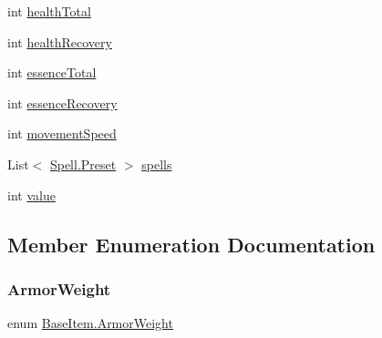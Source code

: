\begin{DoxyCompactItemize}
int \mbox{\hyperlink{class_base_item_acccd778e1b1e14d3820b4d74d71bf1df}{health\+Total}}
\item 
int \mbox{\hyperlink{class_base_item_acb3bb8b3a0f0d7ae56d7f46216bcf4d5}{health\+Recovery}}
\item 
int \mbox{\hyperlink{class_base_item_a6f4e6b8312eda49aac9073e42ee19032}{essence\+Total}}
\item 
int \mbox{\hyperlink{class_base_item_a47d64c0e1e672c7e26191d82ecb1c639}{essence\+Recovery}}
\item 
int \mbox{\hyperlink{class_base_item_a82385b5a578c53ce385d30468d7931c7}{movement\+Speed}}
\item 
List$<$ \mbox{\hyperlink{class_spell_a5520e850e7000a6156b3456672b72ed1}{Spell.\+Preset}} $>$ \mbox{\hyperlink{class_base_item_a00c4f617eb916f07056fe641f67e27ee}{spells}}
\item 
int \mbox{\hyperlink{class_base_item_ac246c2f3f1b1b6e3cae9bef5c26268a2}{value}}
\end{DoxyCompactItemize}


\subsection{Member Enumeration Documentation}
\mbox{\label{class_base_item_a80a37ded5df56d13609012ee892de9dc}} 
\subsubsection{\texorpdfstring{ArmorWeight}{ArmorWeight}}
{\footnotesize\ttfamily enum \mbox{\hyperlink{class_base_item_a80a37ded5df56d13609012ee892de9dc}{Base\+Item.\+Armor\+Weight}}\hspace{0.3cm}{\ttfamily [strong]}}

